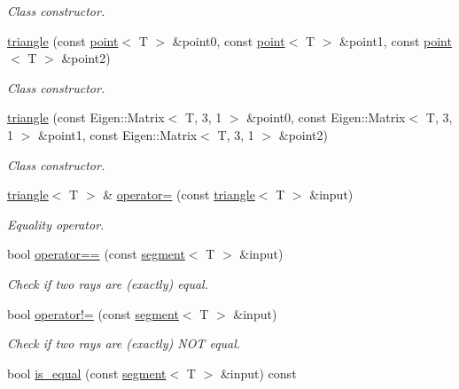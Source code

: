 \begin{DoxyCompactItemize}
\begin{DoxyCompactList}\small\item\em Class constructor. \end{DoxyCompactList}\item 
\hyperlink{classddd_1_1triangle_afca480ce032f9e6ba7058c6817374ef8}{triangle} (const \hyperlink{classddd_1_1point}{point}$<$ T $>$ \&point0, const \hyperlink{classddd_1_1point}{point}$<$ T $>$ \&point1, const \hyperlink{classddd_1_1point}{point}$<$ T $>$ \&point2)
\begin{DoxyCompactList}\small\item\em Class constructor. \end{DoxyCompactList}\item 
\hyperlink{classddd_1_1triangle_a897fbeb1dde322cd30991eb89c645daf}{triangle} (const Eigen\+::\+Matrix$<$ T, 3, 1 $>$ \&point0, const Eigen\+::\+Matrix$<$ T, 3, 1 $>$ \&point1, const Eigen\+::\+Matrix$<$ T, 3, 1 $>$ \&point2)
\begin{DoxyCompactList}\small\item\em Class constructor. \end{DoxyCompactList}\item 
\hyperlink{classddd_1_1triangle}{triangle}$<$ T $>$ \& \hyperlink{classddd_1_1triangle_a6f8b514ac16be9c700105484f0d8b6b1}{operator=} (const \hyperlink{classddd_1_1triangle}{triangle}$<$ T $>$ \&input)
\begin{DoxyCompactList}\small\item\em Equality operator. \end{DoxyCompactList}\item 
bool \hyperlink{classddd_1_1triangle_abc6795d1b802b4386c84047386d7b0c7}{operator==} (const \hyperlink{classddd_1_1segment}{segment}$<$ T $>$ \&input)
\begin{DoxyCompactList}\small\item\em Check if two rays are (exactly) equal. \end{DoxyCompactList}\item 
bool \hyperlink{classddd_1_1triangle_af23c4691bc10de121a1873d4740068fd}{operator!=} (const \hyperlink{classddd_1_1segment}{segment}$<$ T $>$ \&input)
\begin{DoxyCompactList}\small\item\em Check if two rays are (exactly) N\+OT equal. \end{DoxyCompactList}\item 
bool \hyperlink{classddd_1_1triangle_a10426bd9554b5f885775394f90a46851}{is\+\_\+equal} (const \hyperlink{classddd_1_1segment}{segment}$<$ T $>$ \&input) const

\end{DoxyCompactItemize}
